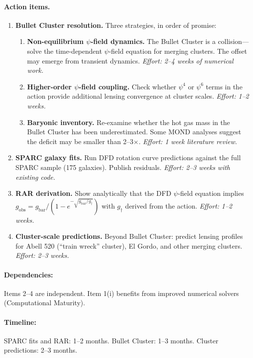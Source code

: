 \documentclass[11pt,a4paper]{article}
\begin{document}
\paragraph{Action items.}
\begin{enumerate}
    \item \textbf{Bullet Cluster resolution.} Three strategies, in order of promise:
    \begin{enumerate}[label=(\roman*)]
        \item \textbf{Non-equilibrium $\psi$-field dynamics.} The Bullet Cluster is a collision---solve the time-dependent $\psi$-field equation for merging clusters. The offset may emerge from transient dynamics. \emph{Effort: 2--4 weeks of numerical work.}
        \item \textbf{Higher-order $\psi$-field coupling.} Check whether $\psi^4$ or $\psi^6$ terms in the action provide additional lensing convergence at cluster scales. \emph{Effort: 1--2 weeks.}
        \item \textbf{Baryonic inventory.} Re-examine whether the hot gas mass in the Bullet Cluster has been underestimated. Some MOND analyses suggest the deficit may be smaller than 2--3$\times$. \emph{Effort: 1 week literature review.}
    \end{enumerate}
    \item \textbf{SPARC galaxy fits.} Run DFD rotation curve predictions against the full SPARC sample (175 galaxies). Publish residuals. \emph{Effort: 2--3 weeks with existing code.}
    \item \textbf{RAR derivation.} Show analytically that the DFD $\psi$-field equation implies $g_{\text{obs}} = g_{\text{bar}} / (1 - e^{-\sqrt{g_{\text{bar}}/g_\dagger}})$ with $g_\dagger$ derived from the action. \emph{Effort: 1--2 weeks.}
    \item \textbf{Cluster-scale predictions.} Beyond Bullet Cluster: predict lensing profiles for Abell 520 (``train wreck'' cluster), El Gordo, and other merging clusters. \emph{Effort: 2--3 weeks.}
\end{enumerate}

\paragraph{Dependencies:} Items 2--4 are independent. Item 1(i) benefits from improved numerical solvers (Computational Maturity).

\paragraph{Timeline:} SPARC fits and RAR: 1--2 months. Bullet Cluster: 1--3 months. Cluster predictions: 2--3 months.
\end{document}

